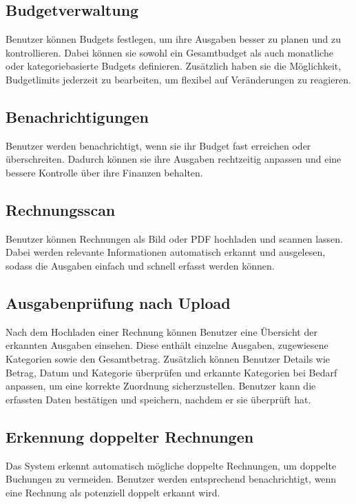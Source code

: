 \documentclass[12pt,a4paper]{article}
\begin{document}
\subsection{Budgetverwaltung}

Benutzer können Budgets festlegen, um ihre Ausgaben besser zu planen und zu 
kontrollieren. Dabei können sie sowohl ein Gesamtbudget als auch monatliche 
oder kategoriebasierte Budgets definieren. Zusätzlich haben sie die Möglichkeit, 
Budgetlimits jederzeit zu bearbeiten, um flexibel auf Veränderungen zu reagieren.

\subsection{Benachrichtigungen}

Benutzer werden benachrichtigt, wenn sie ihr Budget fast erreichen oder überschreiten. 
Dadurch können sie ihre Ausgaben rechtzeitig anpassen und eine bessere Kontrolle über 
ihre Finanzen behalten.

\subsection{Rechnungsscan}

Benutzer können Rechnungen als Bild oder PDF hochladen und scannen lassen. 
Dabei werden relevante Informationen automatisch erkannt und ausgelesen, 
sodass die Ausgaben einfach und schnell erfasst werden können.

\subsection{Ausgabenprüfung nach Upload}

Nach dem Hochladen einer Rechnung können Benutzer eine Übersicht der 
erkannten Ausgaben einsehen. Diese enthält einzelne Ausgaben, zugewiesene 
Kategorien sowie den Gesamtbetrag. Zusätzlich können Benutzer Details wie Betrag, 
Datum und Kategorie überprüfen und erkannte Kategorien bei Bedarf anpassen, um 
eine korrekte Zuordnung sicherzustellen. Benutzer kann die erfassten Daten bestätigen 
und speichern, nachdem er sie überprüft hat.

\subsection{Erkennung doppelter Rechnungen}

Das System erkennt automatisch mögliche doppelte Rechnungen, um doppelte Buchungen 
zu vermeiden. Benutzer werden entsprechend benachrichtigt, wenn eine Rechnung als 
potenziell doppelt erkannt wird.
\end{document}
